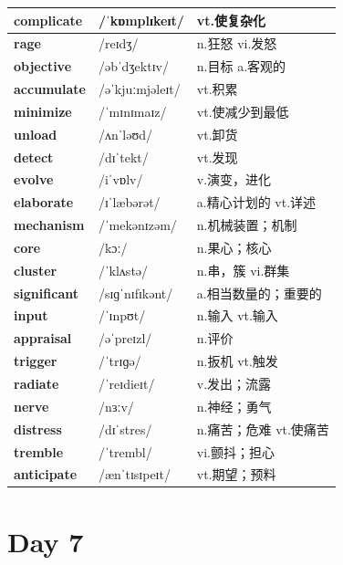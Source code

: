 \documentclass[14pt,a4paper]{extarticle}
\begin{document}
\begin{longtable}{ p{} p{} p{} }
\textbf{complicate} & /ˈkɒmplɪkeɪt/ & vt.使复杂化 \\ \hline
\textbf{rage} & /reɪdʒ/ & n.狂怒 \quad vi.发怒 \\ \hline
\textbf{objective} & /əbˈdʒektɪv/ & n.目标 \quad a.客观的 \\ \hline
\textbf{accumulate} & /əˈkjuːmjəleɪt/ & vt.积累 \\ \hline
\textbf{minimize} & /ˈmɪnɪmaɪz/ & vt.使减少到最低 \\ \hline
\textbf{unload} & /ʌnˈləʊd/ & vt.卸货 \\ \hline
\textbf{detect} & /dɪˈtekt/ & vt.发现 \\ \hline
\textbf{evolve} & /iˈvɒlv/ & v.演变，进化 \\ \hline
\textbf{elaborate} & /ɪˈlæbərət/ & a.精心计划的 \quad vt.详述 \\ \hline
\textbf{mechanism} & /ˈmekənɪzəm/ & n.机械装置；机制 \\ \hline
\textbf{core} & /kɔː/ & n.果心；核心 \\ \hline
\textbf{cluster} & /ˈklʌstə/ & n.串，簇 \quad vi.群集 \\ \hline
\textbf{significant} & /sɪɡˈnɪfɪkənt/ & a.相当数量的；重要的 \\ \hline
\textbf{input} & /ˈɪnpʊt/ & n.输入 \quad vt.输入 \\ \hline
\textbf{appraisal} & /əˈpreɪzl/ & n.评价 \\ \hline
\textbf{trigger} & /ˈtrɪɡə/ & n.扳机 \quad vt.触发 \\ \hline
\textbf{radiate} & /ˈreɪdieɪt/ & v.发出；流露 \\ \hline
\textbf{nerve} & /nɜːv/ & n.神经；勇气 \\ \hline
\textbf{distress} & /dɪˈstres/ & n.痛苦；危难 \quad vt.使痛苦 \\ \hline
\textbf{tremble} & /ˈtrembl/ & vi.颤抖；担心 \\ \hline
\textbf{anticipate} & /ænˈtɪsɪpeɪt/ & vt.期望；预料 \\ \hline
\end{longtable}

\newpage
\section{Day 7}
\end{document}

